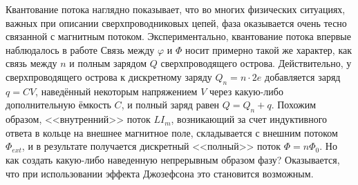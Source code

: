 Квантование потока наглядно показывает, что во многих физических ситуациях, важных при описании сверхпроводниковых цепей, фаза оказывается очень тесно связанной с магнитным потоком. Экспериментально, квантование потока впервые наблюдалось в работе \cite{FluxQuant}  Связь между $\varphi$ и $\Phi$ носит примерно такой же характер, как связь между $n$ и полным зарядом $Q$ сверхпроводящего острова. Действительно, у сверхпроводящего острова к дискретному заряду $Q_n \!=\! n\cdot2e$ добавляется заряд $q\! = \!CV$, наведённый некоторым напряжением $V$ через какую-либо дополнительную ёмкость $C$, и полный заряд равен $Q\!=\!Q_n\!+\!q$. Похожим образом, <<внутренний>> поток $LI_m$, возникающий за счет индуктивного ответа в кольце на внешнее магнитное поле, складывается с внешним потоком $\Phi_{ext}$, и в результате получается дискретный <<полный>> поток $\Phi\!=\!n\Phi_0$. Но как создать какую-либо наведенную непрерывным образом фазу? Оказывается, что при использовании эффекта Джозефсона это становится возможным.
